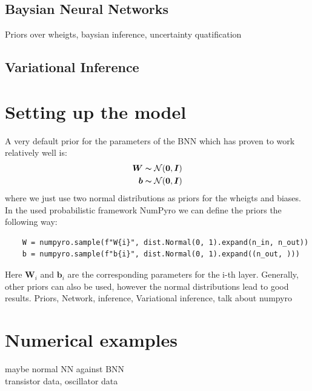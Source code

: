 \documentclass{article}
\begin{document}
\subsection{Baysian Neural Networks}
Priors over wheigts, baysian inference, uncertainty quatification
\subsection{Variational Inference}


\section{Setting up the model}
A very default prior for the parameters of the BNN which has proven to work relatively well \cite{BNNTut} is:
\begin{align}
    \bm W \thicksim \mathcal{N}(\bm 0,\bm I)\\
    \bm b \thicksim \mathcal{N}(\bm 0, \bm I)
\end{align}
where we just use two normal distributions as priors for the wheigts and biases. In the used probabilistic framework NumPyro we can define the priors the following way:
\begin{lstlisting}
    W = numpyro.sample(f"W{i}", dist.Normal(0, 1).expand(n_in, n_out))
    b = numpyro.sample(f"b{i}", dist.Normal(0, 1).expand((n_out, )))
\end{lstlisting}
Here $\bm W_i$ and $\bm b_i$ are the corresponding parameters for the i-th layer. Generally, other priors can also be used, however the normal distributions lead to good results.
Priors, Network, inference, Variational inference, talk about numpyro

\section{Numerical examples}
maybe normal NN against BNN\\
transistor data, oscillator data
\end{document}
